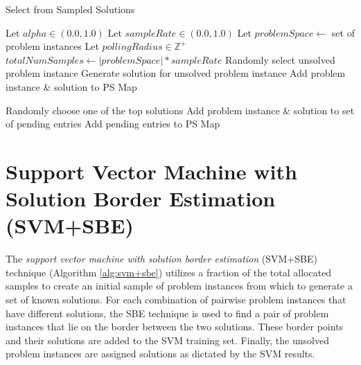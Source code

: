 \begin{algorithm}
\caption{Select from Sampled Solutions}   
\label{alg:sss}
\small
\begin{algorithmic}[1] 
  
  \State Let $alpha \in (0.0,1.0)$
  \State Let $sampleRate \in (0.0,1.0)$
  \State Let $problemSpace \leftarrow$ set of problem instances
  \State Let $pollingRadius \in \mathbb{Z}^+$ 
  \State $totalNumSamples \leftarrow |problemSpace| * sampleRate$
    \State Randomly select unsolved problem instance
    \State Generate solution for unsolved problem instance
    \State Add problem instance \& solution to PS Map
  \EndFor

      \State Randomly choose one of the top solutions
    \EndIf
    \State Add problem instance \& solution to set of pending entries 
  \EndFor
  \State Add pending entries to PS Map 
\end{algorithmic}
\end{algorithm}


\section{Support Vector Machine with Solution Border Estimation (SVM+SBE)}
The \textit{support vector machine with solution border estimation} (SVM+SBE) technique (Algorithm \ref{alg:svm+sbe}) utilizes a fraction of the total allocated samples to create an initial sample of problem instances from which to generate a set of known solutions.  For each combination of pairwise problem instances that have different solutions, the SBE technique is used to find a pair of problem instances that lie on the border between the two solutions.  These border points and their solutions are added to the SVM training set.  Finally, the unsolved problem instances are assigned solutions as dictated by the SVM results.

